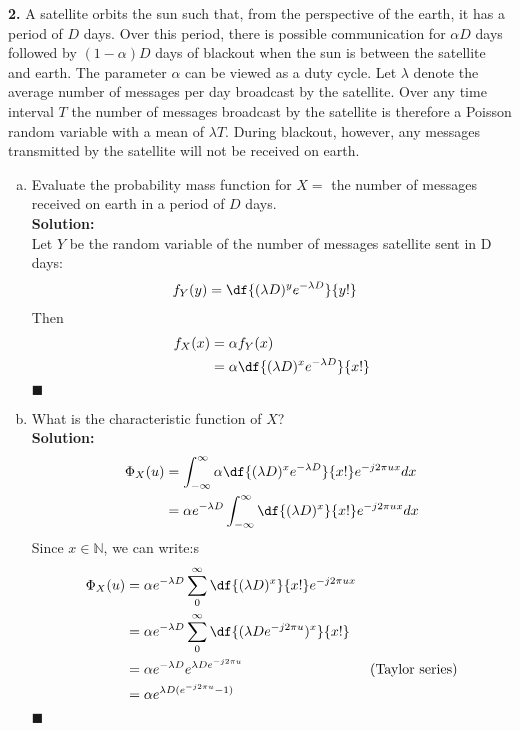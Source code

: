 \textbf{2.} A satellite orbits the sun such that, from the perspective of the earth, it has a period of $D$ days. Over this period, there is possible communication for $\alpha D$ days followed by $(1-\alpha ) D$ days of blackout when the sun is between the satellite and earth. The parameter $\alpha$ can be viewed as a duty cycle. Let $\lambda $ denote the average number of messages per day broadcast by the satellite. Over any time interval $T$ the number of messages broadcast by the satellite is therefore a Poisson random variable with a mean of $\lambda T $. During blackout, however, any messages transmitted by the satellite will not be received on earth.
\begin{enumerate}[(a)]
\item Evaluate the probability mass function for $X=$ the number of messages received on earth in a period of $D$ days.\\
  \textbf{Solution:}\\
  Let $Y$ be the random variable of the number of messages satellite sent in D days:
  \begin{align*}
    f_Y(y) & = \df{(\lambda D)^y e^{-\lambda D}}{y!}
  \end{align*}
  Then
  \begin{align*}
    f_X(x) & = \alpha f_Y(x) \\
           & = \alpha \df{(\lambda D)^x e^{-\lambda D}}{x!}
  \end{align*}
  \hfill $\blacksquare$

\item What is the characteristic function of $X$?\\
  \textbf{Solution:}\\
  \begin{align*}
    \Phi_X(u) & = \int_{-\infty}^{\infty} \alpha \df{(\lambda D)^x e^{-\lambda D}}{x!} e^{-j2\pi ux}dx \\
              & = \alpha e^{-\lambda D} \int_{-\infty}^{\infty} \df{(\lambda D)^x}{x!} e^{-j2\pi ux}dx
  \end{align*}
  Since $x \in \mathbb{N}$, we can write:s
  \begin{align*}
    \Phi_X(u) & = \alpha e^{-\lambda D} \sum_0^{\infty} \df{(\lambda D)^x}{x!} e^{-j2\pi ux} \\
              & = \alpha e^{-\lambda D} \sum_0^{\infty} \df{(\lambda D e^{-j2\pi u})^x}{x!} \\
              & = \alpha e^{-\lambda D} e^{\lambda D e^{-j2\pi u}} & \text{(Taylor series)}\\
              & = \alpha e^{\lambda D (e^{-j2\pi u} - 1)}
  \end{align*}
  \hfill $\blacksquare$


\end{enumerate}
